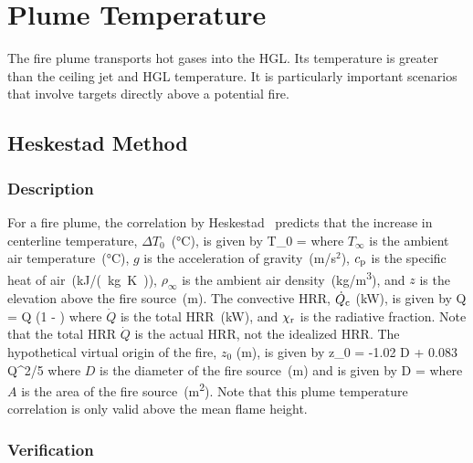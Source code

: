 
\chapter{Plume Temperature}
\label{Plume_Chapter}

The fire plume transports hot gases into the HGL. Its temperature is greater than the ceiling jet and HGL temperature. It is particularly important scenarios that involve targets directly above a potential fire.

\section{Heskestad Method}
\label{sec:Heskestad}

\subsection*{Description}

For a fire plume, the correlation by Heskestad~\cite{SFPE:Heskestad} predicts that the increase in centerline temperature, $\Delta T_0$~(\si{\celsius}), is given by
\be
\Delta T_0 = 
\label{eq:Heskestad}
\ee
where $T_\infty$ is the ambient air temperature~(\si{\celsius}), $g$ is the acceleration of gravity~(m/s$^2$), $c\sb{p}$ is the specific heat of air~(\si{kJ/(kg.K)}), $\rho_{\infty}$ is the ambient air density~(\si{kg/m^3}), and $z$ is the elevation above the fire source~(\si{m}). The convective HRR, $\dot Q\sb{c}$ (\si{kW}), is given by
\be
\dot Q = \dot Q (1 - \chi{})
\label{eq:Heskestad_Qc}
\ee
where $\dot Q$ is the total HRR~(\si{kW}), and $\chi\sb{r}$ is the radiative fraction. Note that the total HRR $\dot Q$ is the actual HRR, not the idealized HRR. The hypothetical virtual origin of the fire, $z_0$ (\si{m}), is given by
\be
z_0 = -1.02 D + 0.083 \dot Q^{2/5}
\label{eq:Heskestad_z0}
\ee
where $D$ is the diameter of the fire source~(\si{m}) and is given by
\be
D = 
\label{eq:Heskestad_D}
\ee
where $A$ is the area of the fire source~(\si{m^2}).
Note that this plume temperature correlation is only valid above the mean flame height.


\clearpage


\subsection*{Verification}

